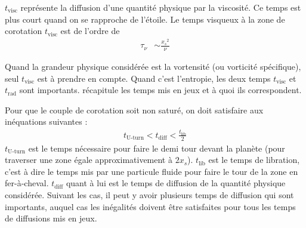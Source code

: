 $t_\text{visc}$ représente la diffusion d'une quantité physique par la viscosité. Ce temps est plus court quand on se rapproche de l'étoile. Le temps visqueux à la zone de corotation $t_\text{visc}$ est  de l'ordre de \citep{masset2001coorbital, masset2002coorbital, ogilvie2003saturation}
\begin{align}
\tau_\nu &\sim \frac{{x_s}^2}{\nu}
\end{align}

Quand la grandeur physique considérée est la vortensité (ou vorticité spécifique), seul $t_\text{visc}$ est à prendre en compte. Quand c'est l'entropie, les deux temps $t_\text{visc}$ et $t_\text{rad}$ sont importants.  récapitule les temps mis en jeux et à quoi ils correspondent.

\bigskip

Pour que le couple de corotation soit non saturé, on doit satisfaire aux inéquations suivantes \citep[eq. (31)]{baruteau2013recent} :
\begin{align}
t_\text{U-turn} < t_\text{diff} < \frac{t_\text{lib}}{2}
\end{align}
$t_\text{U-turn}$ est le temps nécessaire pour faire le demi tour devant la planète (pour traverser une zone égale approximativement à $2x_s$). $t_\text{lib}$ est le temps de libration, c'est à dire le temps mis par une particule fluide pour faire le tour de la zone en fer-à-cheval. $t_\text{diff}$ quant à lui est le temps de diffusion de la quantité physique considérée. Suivant les cas, il peut y avoir plusieurs temps de diffusion qui sont importants, auquel cas les inégalités doivent être satisfaites pour tous les temps de diffusions mis en jeux.


